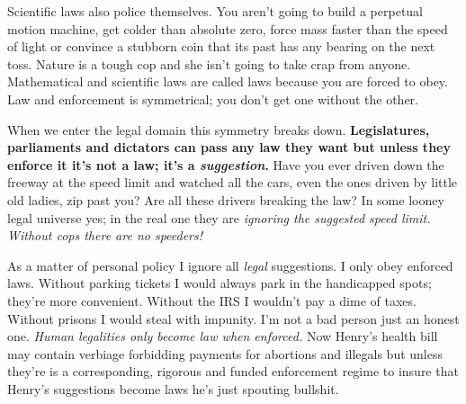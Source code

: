 Scientific laws also police themselves. You aren't going to build a
perpetual motion machine, get colder than absolute zero, force mass
faster than the speed of light or convince a stubborn coin that its past
has any bearing on the next toss. Nature is a tough cop and she isn't
going to take crap from anyone. Mathematical and scientific laws are
called laws because you are forced to obey. Law and enforcement is
symmetrical; you don't get one without the other.

When we enter the legal domain this symmetry breaks down.
\textbf{Legislatures, parliaments and dictators can pass any law they
want but unless they enforce it it's not a law; it's a
\emph{suggestion}.} Have you ever driven down the freeway at the speed
limit and watched all the cars, even the ones driven by little old
ladies, zip past you? Are all these drivers breaking the law? In some
looney legal universe yes; in the real one they are \emph{ignoring the
suggested speed limit.} \emph{Without cops there are no speeders!}

As a matter of personal policy I ignore all \emph{legal} suggestions. I
only obey enforced laws. Without parking tickets I would always park in
the handicapped spots; they're more convenient. Without the IRS I
wouldn't pay a dime of taxes. Without prisons I would steal with
impunity. I'm not a bad person just an honest one. \emph{Human
legalities only become law when enforced.} Now Henry's health bill may
contain verbiage forbidding payments for abortions and illegals but
unless they're is a corresponding, rigorous and funded enforcement
regime to insure that Henry's suggestions become laws he's just spouting
bullshit.



%